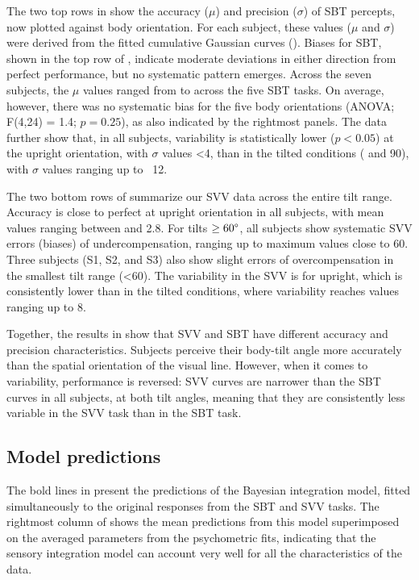 The two top rows in  show the accuracy ($\mu$) and precision ($\sigma$) of SBT percepts, now plotted against body orientation. For each subject, these values ($\mu$ and $\sigma$) were derived from the fitted cumulative Gaussian curves (). Biases for SBT, shown in the top row of , indicate moderate deviations in either direction from perfect performance, but no systematic pattern emerges. Across the seven subjects, the $\mu$ values ranged from  to  across the five SBT tasks. On average, however, there was no systematic bias for the five body orientations (ANOVA; F(4,24) = 1.4; $p = 0.25$), as also indicated by the rightmost panels. The data further show that, in all subjects, variability is statistically lower ($p < 0.05$) at the upright orientation, with $\sigma$ values \textless4\textdegree, than in the tilted conditions ( and 90\textdegree), with $\sigma$ values ranging up to ~12\textdegree. 

The two bottom rows of  summarize our SVV data across the entire tilt range. Accuracy is close to perfect at upright orientation in all subjects, with mean values ranging between  and 2.8\textdegree. For tilts $\ge60\degree$, all subjects show systematic SVV errors (biases) of undercompensation, ranging up to maximum values close to 60\textdegree. Three subjects (S1, S2, and S3) also show slight errors of overcompensation in the smallest tilt range (\textless60\textdegree). The variability in the SVV is  for upright, which is consistently lower than in the tilted conditions, where variability reaches values ranging up to 8\textdegree. 

Together, the results in  show that SVV and SBT have different accuracy and precision characteristics. Subjects perceive their body-tilt angle more accurately than the spatial orientation of the visual line. However, when it comes to variability, performance is reversed: SVV curves are narrower than the SBT curves in all subjects, at both tilt angles, meaning that they are consistently less variable in the SVV task than in the SBT task. 

\subsection{Model predictions}

The bold lines in  present the predictions of the Bayesian integration model, fitted simultaneously to the original responses from the SBT and SVV tasks. The rightmost column of  shows the mean predictions from this model superimposed on the averaged parameters from the psychometric fits, indicating that the sensory integration model can account very well for all the characteristics of the data. 

